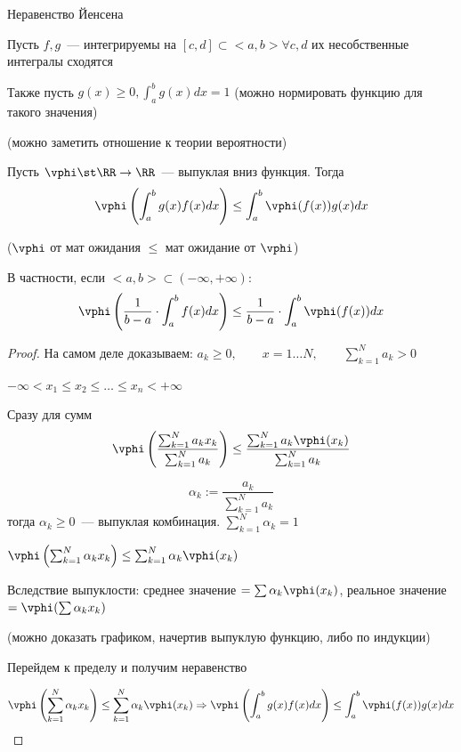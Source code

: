 \begin{Theorem}{Неравенство Йенсена}{}

    Пусть $f, g$~--- интегрируемы на $[c, d] \subset <a, b> \forall c, d$ их несобственные интегралы сходятся

    Также пусть $g(x) \ge 0, \int^b_a g(x) dx = 1$ (можно нормировать функцию для такого значения)

    (можно заметить отношение к теории вероятности)

    Пусть $\vphi \st \RR \rightarrow \RR$~--- выпуклая вниз функция. Тогда
    \[
    \vphi\left(\int^b_a g(x)f(x) dx\right) \le \int^b_a \vphi(f(x))g(x) dx
    \]

    ($\vphi$ от мат ожидания $\le$ мат ожидание от $\vphi$)

    В частности, если $<a, b> \subset (-\infty, +\infty):$
    \[
    \vphi\left( \frac{1}{b-a}\cdot\int^b_af(x)dx\right) \le \frac{1}{b-a}\cdot \int^b_a \vphi(f(x))dx
    \]

\end{Theorem}

\begin{proof}

    На самом деле доказываем:
    $a_k \ge 0, \qquad x=1\ldots N, \qquad \sum^N_{k=1}a_k > 0$

    $-\infty < x_1 \le x_2 \le \ldots \le x_n < +\infty$

    Сразу для сумм 
    \[ 
    \vphi\left(\frac{\sum^N_{k=1}a_kx_k}{\sum^N_{k=1}a_k}\right) \le \frac{\sum^N_{k=1}a_k\vphi(x_k)}{\sum^N_{k=1}a_k}
    \]

    \[
    \alpha_k := \frac{a_k}{\sum^N_{k=1}a_k}
    \] 
    тогда $\alpha_k \ge 0$~--- выпуклая комбинация. $\sum^N_{k=1}\alpha_k = 1$

    $\vphi \left(\sum^N_{k=1}\alpha_kx_k\right) \le \sum^N_{k=1}\alpha_k\vphi(x_k)$

    Вследствие выпуклости: среднее значение $ = \sum\alpha_k\vphi(x_k)$,
    реальное значение $= \vphi(\sum\alpha_kx_k)$

    (можно доказать графиком, начертив выпуклую функцию, либо по индукции)

    Перейдем к пределу и получим неравенство

    \[
    \vphi\left(\sum^N_{k=1}\alpha_kx_k\right) \le \sum^N_{k=1}\alpha_k \vphi(x_k) \Rightarrow 
    \vphi\left(\int^b_a g(x)f(x) dx\right) \le \int^b_a \vphi(f(x))g(x) dx 
    \]
\end{proof}



